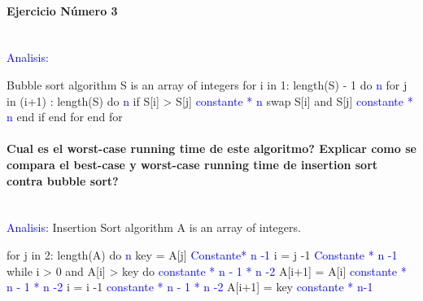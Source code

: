 \documentclass{article}
\begin{document}
\paragraph{Ejercicio Número 3} ~\\ \newline
\textcolor{blue}{Analisis:} \newline

Bubble sort algorithm \newline
S is an array of integers	\bigskip \newline
for i in 1: length(S) - 1 do	 \textcolor{blue}{ n } \newline 
\indent for j in (i+1) : length(S) do	\textcolor{blue}{ n  } \newline
\indent \indent		if S[i] > S[j]	\textcolor{blue}{  constante  *  n}\newline
\indent \indent \indent		swap S[i] and S[j]	\textcolor{blue}{ constante * n }\newline
\indent \indent	end if 	\newline
\indent	end for	\newline
end for \bigskip	\newline

\paragraph{Cual es el worst-case running time de este algoritmo? \newline
Explicar como se compara el best-case y worst-case running time de insertion sort contra bubble sort? }~ \\ \newline
\textcolor{blue}{Analisis:} \newline
Insertion Sort algorithm \newline
A is an array of integers. \bigskip \newline

for j in 2:  length(A) do  \textcolor{blue}{ n  }\newline
\indent \indent key = A[j] \textcolor{blue}{ Constante*  n -1 } \newline
\indent  \indent	i = j -1 \textcolor{blue}{ Constante * n -1 } \newline
\indent \indent while i > 0 and A[i] > key  do \textcolor{blue}{ constante * n - 1 * n -2  } \newline
\indent \indent	\indent A[i+1] = A[i] \textcolor{blue}{ constante * n - 1 * n  -2   } \newline
\indent \indent	\indent  i = i -1 \textcolor{blue}{ constante *  n - 1 * n -2   } \newline
\indent  \indent A[i+1] = key \textcolor{blue}{ constante * n-1 } \bigskip \newline
\end{document}
